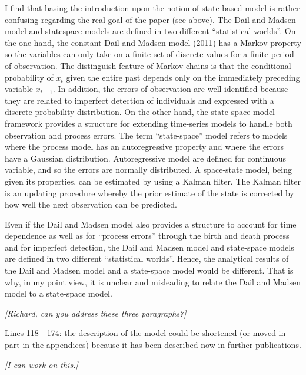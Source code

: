 \documentclass[12pt,english]{article}
\begin{document}
\begin{spacing}{1.9}
\begin{flushleft}
I find that basing the introduction upon the notion of state-based model is rather confusing
regarding the real goal of the paper (see above). The Dail and Madsen model and statespace
models are defined in two different ``statistical worlds''. On the one hand, the constant
Dail and Madsen model (2011) has a Markov property so the variables can only take on a
finite set of discrete values for a finite period of observation. The distinguish feature of
Markov chains is that the conditional probability of $x_{t}$ given the entire past depends only on
the immediately preceding variable $x_{t-1}$. In addition, the errors of observation are well
identified because they are related to imperfect detection of individuals and expressed with
a discrete probability distribution. On the other hand, the state-space model framework
provides a structure for extending time-series models to handle both observation and
process errors. The term ``state-space'' model refers to models where the process model has
an autoregressive property and where the errors have a Gaussian distribution.
Autoregressive model are defined for continuous variable, and so the errors are normally
distributed. A space-state model, being given its properties, can be estimated by using a
Kalman filter. The Kalman filter is an updating procedure whereby the prior estimate of the
state is corrected by how well the next observation can be predicted.

Even if the Dail and Madsen model also provides a structure to account for time dependence
as well as for ``process errors'' through the birth and death process and for imperfect
detection, the Dail and Madsen model and state-space models are defined in two different
``statistical worlds''. Hence, the analytical results of the Dail and Madsen model and a state-space
model would be different. That is why, in my point view, it is unclear and misleading to
relate the Dail and Madsen model to a state-space model.

\vspace{0.5cm}
\textit{[Richard, can you address these three paragraphs?]}
\vspace{0.5cm}

Lines 118 - 174: the description of the model could be shortened (or moved in part in the
appendices) because it has been described now in further publications.

\vspace{0.5cm}
\textit{[I can work on this.]}
\vspace{0.5cm}


\end{flushleft}
\end{spacing}
\end{document}

